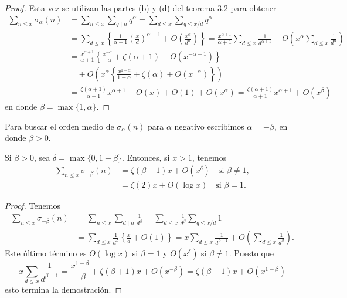 \documentclass[12pt,a4paper]{book}
\begin{document}
    \begin{proof}
        Esta vez se utilizan las partes (b) y (d) del teorema 3.2 para obtener
        \begin{align*}
            \sum_{n\leq x}\sigma_{\alpha}(n)&=\sum_{n\leq x}\sum_{q\mid n}q^{\alpha}
            =\sum_{d\leq x}\sum_{q\leq x/d}q^{\alpha}\\
            &=\sum_{d\leq x}\left\{\frac{1}{\alpha+1}\left(\frac{x}{d}\right)^{\alpha+1}
            +O\left(\frac{x^{\alpha}}{d^{\alpha}}\right)\right\}
            =\frac{x^{\alpha+1}}{\alpha+1}\sum_{d\leq x}\frac{1}{d^{\alpha+1}}
            +O\left(x^{\alpha}\sum_{d\leq x}\frac{1}{d^{\alpha}}\right)\\
            &=\frac{x^{\alpha+1}}{\alpha+1}\left\{\frac{x^{-\alpha}}{-\alpha}+\zeta(\alpha+1)
            +O(x^{-\alpha-1})\right\}\\
            &\quad+O\left(x^{\alpha}\left\{\frac{x^{1-\alpha}}{1-\alpha}+\zeta(\alpha)+O(x^{-\alpha})\right\}\right)\\
            &=\frac{\zeta(\alpha+1)}{\alpha+1}x^{\alpha+1}+O(x)+O(1)+O(x^{\alpha})
            =\frac{\zeta(\alpha+1)}{\alpha+1}x^{\alpha+1}+O(x^{\beta})
        \end{align*}
        en donde $\beta=\max\{1,\alpha\}$.
    \end{proof}

    Para buscar el orden medio de $\sigma_{\alpha}(n)$ para $\alpha$ negativo escribimos
    $\alpha=-\beta$, en donde $\beta>0$.

    \begin{teorema}
        Si $\beta>0$, sea $\delta=\max\{0,1-\beta\}$. Entonces, si $x>1$, tenemos
        \begin{align*}
            \sum_{n\leq x}\sigma_{-\beta}(n)&=\zeta(\beta+1)x+O(x^{\delta})\quad\text{si } \beta\neq1,\\
            &=\zeta(2)x+O(\log x)\quad\text{si } \beta=1.
        \end{align*}
    \end{teorema}

    \begin{proof}
        Tenemos
        \begin{align*}
            \sum_{n\leq x}\sigma_{-\beta}(n)&=\sum_{n\leq x}\sum_{d\mid n}\frac{1}{d^{\beta}}
            =\sum_{d\leq x}\frac{1}{d^{\beta}}\sum_{q\leq x/d}1\\
            &=\sum_{d\leq x}\frac{1}{d^{\beta}}\left\{\frac{x}{d}+O(1)\right\}
            =x\sum_{d\leq x}\frac{1}{d^{\beta+1}}+O\left(\sum_{d\leq x}\frac{1}{d^{\beta}}\right).
        \end{align*}
        Este último término es $O(\log x)$ si $\beta=1$ y $O(x^{\delta})$ si $\beta\neq1$.
        Puesto que
        \begin{equation*}
            x\sum_{d\leq x}\frac{1}{d^{\beta+1}}=\frac{x^{1-\beta}}{-\beta}+\zeta(\beta+1)x+O(x^{-\beta})
            =\zeta(\beta+1)x+O(x^{1-\beta})
        \end{equation*}
        esto termina la demostración.
    \end{proof}
\end{document}

